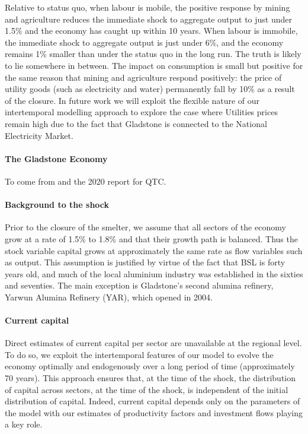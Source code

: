 \documentclass[12pt,a4paper]{article}
\begin{document}
Relative to status quo, when labour is mobile, the positive response by mining
and agriculture reduces the immediate shock to aggregate output to just under
1.5\% and the economy has caught up within 10 years.  When labour is immobile,
the immediate shock to aggregate output is just under 6\%, and the economy
remains 1\% smaller than under the status quo in the long run. The truth is
likely to lie somewhere in between. The impact on consumption is small but
positive for the same reason that mining and agriculture respond positively:
the price of utility goods (such as electricity and water) permanently fall by
10\% as a result of the closure. In future work we will exploit the flexible
nature of our intertemporal modelling approach to explore the case where
Utilities prices remain high due to the fact that Gladstone is connected to the
National Electricity Market.

\paragraph{The Gladstone Economy} To come from \cite{glad-prospectus} and
the 2020 report for QTC.

\paragraph{Background to the shock} Prior to the closure of the smelter, we
assume that all sectors of the economy grow at a rate of 1.5\% to 1.8\% and
that their growth path is balanced. Thus the stock variable capital grows at
approximately the same rate as flow variables such as output.  This assumption
is justified by virtue of the fact that BSL is forty years old, and much of the
local aluminium industry was established in the sixties and seventies.  The
main exception is Gladstone's second alumina refinery, Yarwun Alumina Refinery
(YAR), which opened in 2004.

\paragraph{Current capital} Direct estimates of current capital per sector are
unavailable at the regional level. To do so, we exploit the intertemporal
features of our model to evolve the economy optimally and endogenously over a
long period of time (approximately 70 years).  This approach ensures that, at
the time of the shock, the distribution of capital across sectors, at the time
of the shock, is independent of the initial distribution of capital.  Indeed,
current capital depends only on the parameters of the model with our estimates
of productivity factors and investment flows playing a key role. 
\end{document}

